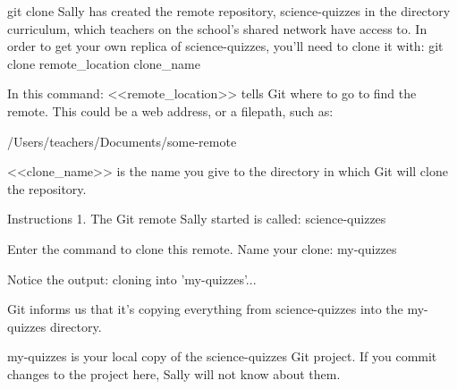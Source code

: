 git clone
    Sally has created the remote repository, science-quizzes in the directory curriculum, which teachers on the school’s shared network have access to. In order to get your own replica of science-quizzes, you’ll need to clone it with:
        git clone remote_location clone_name

    In this command:
        <<remote_location>> tells Git where to go to find the remote. This could be a web address, or a filepath, such as:
    
        /Users/teachers/Documents/some-remote
    
        <<clone_name>> is the name you give to the directory in which Git will clone the repository.

Instructions
    1.
    The Git remote Sally started is called:
        science-quizzes
    
    Enter the command to clone this remote. Name your clone:
        my-quizzes
    
    Notice the output:
        cloning into 'my-quizzes'...
    
    Git informs us that it’s copying everything from science-quizzes into the my-quizzes directory.

    my-quizzes is your local copy of the science-quizzes Git project. If you commit changes to the project here, Sally will not know about them.